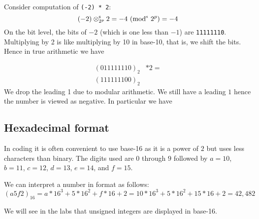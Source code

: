 \begin{example} Consider computation of \texttt{(-2) * 2}:
\[
(-2) \ensuremath{\otimes}_{2^p}^{\rm s} 2 = -4 \ ({\rm mod}^{\rm s}\ 2^p) = -4
\]
On the bit level, the bits of $-2$ (which is one less than $-1$) are \texttt{11111110}. Multiplying by 2 is like multiplying by 10 in base-10, that is, we shift the bits. Hence in true arithmetic we have


\begin{align*}
(0 11111110)_2 & * 2 = \\
(1 11111100)_2&
\end{align*}
We drop the leading 1 due to modular arithmetic. We still have a leading $1$ hence the number is viewed as negative. In particular we have
\end{example}

\subsection{Hexadecimal format}
In coding it is often convenient to use base-16 as it is a power of $2$ but uses less characters than binary. The digits used are $0$ through $9$ followed by $a = 10$, $b = 11$, $c = 12$, $d = 13$, $e = 14$, and $f = 15$. 

\begin{example} We can interpret a number in format as follows:
\[
(a5f2)_{16} = a*16^3 + 5*16^2 + f*16 + 2 = 
10*16^3 + 5*16^2 + 15*16 + 2 = 42,482
\]
\end{example}

We will see in the labs that unsigned integers are displayed in base-16.



